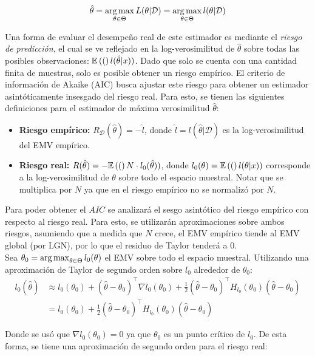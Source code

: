 \begin{equation}
	\hat{\theta} = \operatorname*{arg\,max}_{\theta\in\Theta} L(\theta|\mathcal{D}) =  \operatorname*{arg\,max}_{\theta\in\Theta} l(\theta|\mathcal{D})
\end{equation}

Una forma de evaluar el desempeño real de este estimador es mediante el \emph{riesgo de predicción}, el cual se ve reflejado en la log-verosimilitud de $\hat{\theta}$ sobre todas las posibles observaciones: $\mathbb{E} \left((\right)l(\hat{\theta}|x))$. Dado que solo se cuenta con una cantidad finita de muestras, solo es posible obtener un riesgo empírico. El criterio de información de Akaike (AIC) busca ajustar este riesgo para obtener un estimador asintóticamente insesgado del riesgo real. Para esto, se tienen las siguientes definiciones para el estimador de máxima verosimilitud $\hat{\theta}$:

\begin{itemize}
	\item \textbf{Riesgo empírico:} $R_\mathcal{D}(\hat{\theta})=-\hat{l}$, donde $\hat{l}=l(\hat{\theta}|\mathcal{D})$ es la log-verosimilitud del EMV empírico.
	\item \textbf{Riesgo real:} $R(\hat{\theta})=-\mathbb{E} \left((\right)N\cdot l_0(\hat{\theta}))$, donde $l_0(\theta)=\mathbb{E} \left((\right)l(\theta|x))$ corresponde a la log-verosimilitud de $\theta$ sobre todo el espacio muestral. Notar que se multiplica por $N$ ya que en el riesgo empírico no se normalizó por $N$.
\end{itemize}

Para poder obtener el $AIC$ se analizará el sesgo asintótico del riesgo empírico con respecto al riesgo real. Para esto, se utilizarán aproximaciones sobre ambos riesgos, asumiendo que a medida que $N$ crece, el EMV empírico tiende al EMV global (por LGN), por lo que el residuo de Taylor tenderá a 0.\\

Sea $\theta_0 = \operatorname*{arg\,max}_{\theta\in\Theta} l_0(\theta)$ el EMV sobre todo el espacio muestral. Utilizando una aproximación de Taylor de segundo orden sobre $l_0$ alrededor de $\theta_0$:
\begin{align}
	l_0(\hat{\theta})&\approx l_0(\theta_0) + (\hat{\theta}-\theta_0)^\top \nabla l_0(\theta_0) + \frac{1}{2}(\hat{\theta}-\theta_0)^\top H_{l_0}(\theta_0) (\hat{\theta}-\theta_0)\\
	&= l_0(\theta_0) + \frac{1}{2}(\hat{\theta}-\theta_0)^\top H_{l_0}(\theta_0) (\hat{\theta}-\theta_0)
\end{align}

Donde se usó que $\nabla l_0(\theta_0)=0$ ya que $\theta_0$ es un punto crítico de $l_0$. De esta forma, se tiene una aproximación de segundo orden para el riesgo real:


